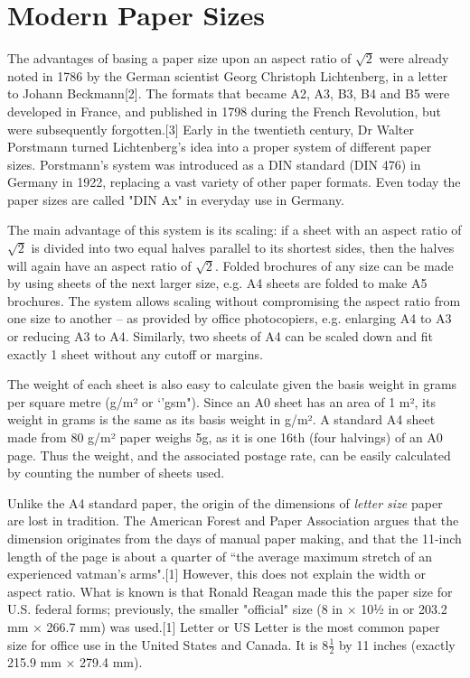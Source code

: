 \section{Modern Paper Sizes}
The advantages of basing a paper size upon an aspect ratio of $\surd{2}$ were already noted in 1786 by the German scientist Georg Christoph Lichtenberg, in a letter to Johann Beckmann[2]. The formats that became A2, A3, B3, B4 and B5 were developed in France, and published in 1798 during the French Revolution, but were subsequently forgotten.[3]
Early in the twentieth century, Dr Walter Porstmann turned Lichtenberg's idea into a proper system of different paper sizes. Porstmann's system was introduced as a DIN standard (DIN 476) in Germany in 1922, replacing a vast variety of other paper formats. Even today the paper sizes are called "DIN Ax" in everyday use in Germany.

The main advantage of this system is its scaling: if a sheet with an aspect ratio of $\surd{2}$ is divided into two equal halves parallel to its shortest sides, then the halves will again have an aspect ratio of $\surd{2}$. Folded brochures of any size can be made by using sheets of the next larger size, e.g. A4 sheets are folded to make A5 brochures. The system allows scaling without compromising the aspect ratio from one size to another – as provided by office photocopiers, e.g. enlarging A4 to A3 or reducing A3 to A4. Similarly, two sheets of A4 can be scaled down and fit exactly 1 sheet without any cutoff or margins.

The weight of each sheet is also easy to calculate given the basis weight in grams per square metre (g/m² or `'gsm"). Since an A0 sheet has an area of 1 m², its weight in grams is the same as its basis weight in g/m². A standard A4 sheet made from 80 g/m² paper weighs 5g, as it is one 16th (four halvings) of an A0 page. Thus the weight, and the associated postage rate, can be easily calculated by counting the number of sheets used.

Unlike the A4 standard paper, the origin of the dimensions of \textit{letter size} paper are lost in tradition. The American Forest and Paper Association argues that the dimension originates from the days of manual paper making, and that the 11-inch length of the page is about a quarter of ``the average maximum stretch of an experienced vatman's arms".[1] However, this does not explain the width or aspect ratio. What is known is that Ronald Reagan made this the paper size for U.S. federal forms; previously, the smaller "official" size (8 in × 10½ in or 203.2 mm × 266.7 mm) was used.[1] Letter or US Letter is the most common paper size for office use in the United States and Canada. It is 8$\frac{1}{2}$ by 11 inches (exactly 215.9 mm × 279.4 mm).


